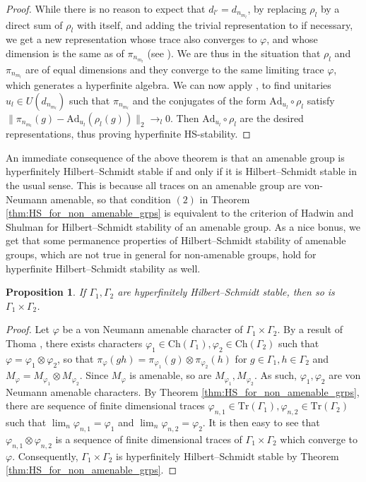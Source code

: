 \documentclass[11pt]{amsart}
\newcommand{\Ch}[1]{\mathrm{Ch}\left(#1\right)}
\newcommand{\Tr}[1]{\mathrm{Tr}\left(#1\right)}
\newtheorem{proposition}[theorem]{Proposition}
\theoremstyle{definition}
\theoremstyle{remark}
\theoremstyle{definition}
\begin{document}
\begin{proof}
    While there is no reason to expect that $d_{l'} = d_{n_{m_l}}$, by replacing $\rho_l$  by a direct sum of $\rho_l$ with itself, and  adding the trivial representation to if  necessary, we get a new representation whose trace also converges to $\varphi$, and whose dimension is the same as of $\pi_{n_{m_l}}$ (see \cite[Lemma 3.7]{HS_alg}). 
    We are thus in the situation that $ \rho_l$ and $\pi_{n_{m_l}}$ are of equal dimensions and they converge to the same limiting trace $\varphi$, which generates a hyperfinite algebra. We can now apply \cite[Theorem 1.1]{HS_alg}, to find unitaries $u_l \in U(d_{n_{m_l}})$ such that $\pi_{n_{m_l}}$ and the conjugates of the form $\mathrm{Ad}_{u_l}\circ \rho_l$ satisfy $\| \pi_{n_{m_l}}(g) - \mathrm{Ad}_{u_l}(\rho_l(g)) \|_2 \to_l 0$.
    Then  $\mathrm{Ad}_{u_l}\circ \rho_l$  are the desired representations, thus proving hyperfinite HS-stability. 
\end{proof} 

An immediate consequence of the above theorem is that an amenable group is hyperfinitely Hilbert--Schmidt stable if and only if it is Hilbert--Schmidt stable in the usual sense.
This is because all traces on an amenable group are von-Neumann amenable, so that condition $(2)$ in Theorem \ref{thm:HS_for_non_amenable_grps} is equivalent to the criterion of Hadwin and Shulman for Hilbert--Schmidt stability of an amenable group.
As a nice bonus, we get that some permanence properties of Hilbert--Schmidt stability of amenable groups, which are not true in general for non-amenable groups, hold for hyperfinite Hilbert--Schmidt stability as well.

\begin{proposition}\label{prop:hyp_stab_prod}
    If $\Gamma_1, \Gamma_2$ are hyperfinitely Hilbert--Schmidt stable, then so is $\Gamma_1 \times\Gamma_2$.
\end{proposition}
\begin{proof}
    Let $\varphi$ be a von Neumann amenable character of $\Gamma_1 \times \Gamma_2$. By a result of Thoma \cite{thoma1964unitare}, there exists characters $\varphi_1 \in \Ch{\Gamma_1}, \varphi_2 \in \Ch{\Gamma_2}$ such that $\varphi = \varphi_1 \otimes \varphi_2$, so that $\pi_{\varphi}(g h) = \pi_{\varphi_1}(g) \otimes \pi_{\varphi_2}(h)$ for $g \in \Gamma_1, h \in \Gamma_2$ and $M_{\varphi} = M_{\varphi_1} \otimes M_{\varphi_2}$.
    Since $M_{\varphi}$ is amenable, so are $M_{\varphi_1}, M_{\varphi_2}$. As such, $\varphi_1 ,\varphi_2$ are von Neumann amenable characters. 
    By Theorem \ref{thm:HS_for_non_amenable_grps}, there are sequence of finite dimensional traces $\varphi_{n,1} \in \Tr{\Gamma_1}, \varphi_{n,2} \in \Tr{\Gamma_2}$ such that $\lim_n \varphi_{n,1}= \varphi_1$ and $ \lim_n \varphi_{n,2} = \varphi_2$.
    It is then easy to see that $\varphi_{n,1} \otimes \varphi_{n,2}$ is a sequence of finite dimensional traces of $\Gamma_1 \times\Gamma_2$ which converge to  $\varphi$. 
    Consequently, $\Gamma_1 \times\Gamma_2$ is hyperfinitely Hilbert--Schmidt stable by Theorem \ref{thm:HS_for_non_amenable_grps}.
    \end{proof}
\end{document}
